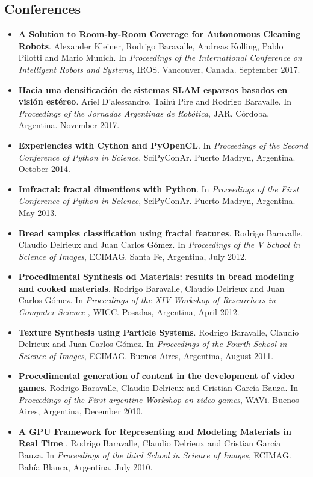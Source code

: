 \documentclass[a4paper,12pt]{article}
\begin{document}
\subsection*{\color{niceblue} Conferences}
\begin{itemize}
\item {\bf A Solution to Room-by-Room Coverage for Autonomous Cleaning Robots}. Alexander Kleiner, Rodrigo Baravalle, Andreas Kolling, Pablo Pilotti and Mario Munich. In {\it Proceedings of the International Conference on Intelligent Robots and Systems}, IROS. Vancouver, Canada. September 2017.
\item {\bf Hacia una densificación de sistemas SLAM esparsos basados en visión estéreo}. Ariel D'alessandro, Taihú Pire and Rodrigo Baravalle. In {\it Proceedings of the Jornadas Argentinas de Robótica}, JAR. Córdoba, Argentina. November 2017.
\item {\bf Experiencies with Cython and PyOpenCL}. In {\it Proceedings of the Second Conference of Python in Science}, SciPyConAr. Puerto Madryn, Argentina. October 2014.
\item {\bf Imfractal: fractal dimentions with Python}.  In {\it Proceedings of the First Conference of Python in Science}, SciPyConAr. Puerto Madryn, Argentina. May 2013.
\item {\bf Bread samples classification using fractal features}. Rodrigo Baravalle, Claudio Delrieux and Juan Carlos G\'omez. In {\it Proceedings of the V School in Science of Images}, ECIMAG. Santa Fe, Argentina, July 2012.
\item {\bf Procedimental Synthesis od Materials: results in bread modeling and cooked materials}. Rodrigo Baravalle, Claudio Delrieux and Juan Carlos G\'omez. In {\it Proceedings of the XIV Workshop of Researchers in Computer Science }, WICC. Posadas, Argentina, April 2012.
\item {\bf Texture Synthesis using Particle Systems}. Rodrigo Baravalle, Claudio Delrieux and Juan Carlos G\'omez. In {\it Proceedings of the Fourth School in Science of Images}, ECIMAG. Buenos Aires, Argentina, August 2011.
\item {\bf Procedimental generation of content in the development of video games}. Rodrigo Baravalle, Claudio Delrieux and Cristian Garc\'ia Bauza. In {\it Proceedings of the First argentine Workshop on video games}, WAVi. Buenos Aires, Argentina, December 2010.
\item {\bf A GPU Framework for Representing and Modeling Materials in Real Time }. Rodrigo Baravalle, Claudio Delrieux and Cristian Garc\'ia Bauza. In {\it Proceedings of the third School in Science of Images}, ECIMAG. Bahía Blanca, Argentina, July 2010.
\end{itemize}
\end{document}
